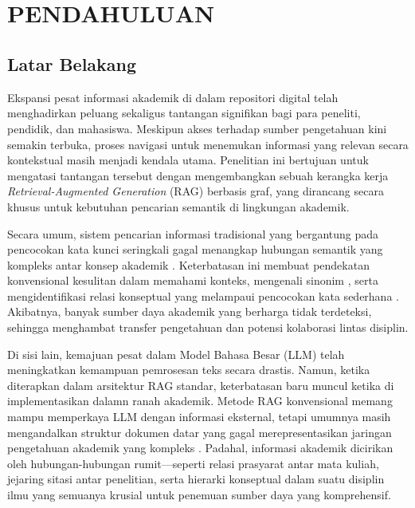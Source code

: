 
\chapter[PENDAHULUAN]{\\ PENDAHULUAN}

\section{Latar Belakang}

Ekspansi pesat informasi akademik di dalam repositori digital telah menghadirkan peluang sekaligus tantangan signifikan bagi para peneliti, pendidik, dan mahasiswa. Meskipun akses terhadap sumber pengetahuan kini semakin terbuka, proses navigasi untuk menemukan informasi yang relevan secara kontekstual masih menjadi kendala utama. Penelitian ini bertujuan untuk mengatasi tantangan tersebut dengan mengembangkan sebuah kerangka kerja \textit{Retrieval-Augmented Generation} (RAG) berbasis graf, yang dirancang secara khusus untuk kebutuhan pencarian semantik di lingkungan akademik.

Secara umum, sistem pencarian informasi tradisional yang bergantung pada pencocokan kata kunci seringkali gagal menangkap hubungan semantik yang kompleks antar konsep akademik \cite{indexingbylatent}. Keterbatasan ini membuat pendekatan konvensional kesulitan dalam memahami konteks, mengenali sinonim \cite{indexingbylatent}, serta mengidentifikasi relasi konseptual yang melampaui pencocokan kata sederhana \cite{introretrieval}. Akibatnya, banyak sumber daya akademik yang berharga tidak terdeteksi, sehingga menghambat transfer pengetahuan dan potensi kolaborasi lintas disiplin.

Di sisi lain, kemajuan pesat dalam Model Bahasa Besar (LLM) telah meningkatkan kemampuan pemrosesan teks secara drastis. Namun, ketika diterapkan dalam arsitektur RAG standar, keterbatasan baru muncul ketika di implementasikan dalamn ranah akademik. Metode RAG konvensional memang mampu memperkaya LLM dengan informasi eksternal, tetapi umumnya masih mengandalkan struktur dokumen datar yang gagal merepresentasikan jaringan pengetahuan akademik yang kompleks \cite{retrievalaugmentedgenerationlargelanguage}. Padahal, informasi akademik dicirikan oleh hubungan-hubungan rumit—seperti relasi prasyarat antar mata kuliah, jejaring sitasi antar penelitian, serta hierarki konseptual dalam suatu disiplin ilmu yang semuanya krusial untuk penemuan sumber daya yang komprehensif.

